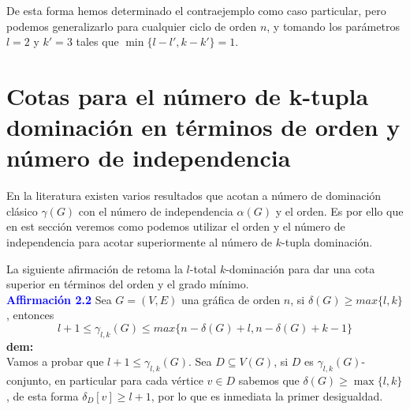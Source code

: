 \documentclass{article}
\begin{document}
De esta forma hemos determinado el contraejemplo como caso particular, pero podemos generalizarlo para cualquier ciclo de orden $n$, y tomando los parámetros $l=2$ y $k'=3$ tales que $\min\{l-l', k-k'\} = 1$.






\newpage

\section{Cotas  para el número de k-tupla dominación en términos de orden y número de independencia}


En la literatura existen varios resultados que acotan a número de dominación clásico $\gamma(G)$ con el número de independencia $\alpha(G)$ y el orden. Es por ello que en est sección veremos como podemos utilizar el orden y el número de independencia para acotar superiormente al número de $k$-tupla dominación.\\

La siguiente afirmación de \cite{favaron2001domination} retoma la $l$-total $k$-dominación para dar una cota superior en términos del orden y el grado mínimo.\\


\textcolor{blue}{\textbf{Affirmación 2.2}} Sea $G=(V, E)$ una gráfica de orden $n$, si $\delta(G)\geq max\{l,k\}$, entonces
$$l+1\leq \gamma_{l,k}(G)\leq max\{n-\delta(G)+l, n-\delta(G) +k-1\}$$
\textbf{dem:}\\
Vamos a probar que $l+1\leq \gamma_{l,k}(G)$. Sea $D\subseteq V(G)$, si $D$ es $\gamma_{l,k}(G)$-conjunto, en particular para cada vértice $v \in D$ sabemos que $\delta(G)\ge \max\{l,k\}$, de esta forma $\delta_D[v]\ge l+1$, por lo que es inmediata la primer desigualdad.\\
\end{document}
